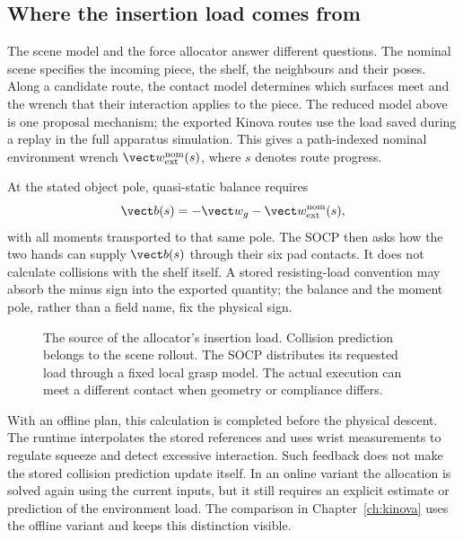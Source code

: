 \subsection{Where the insertion load comes from}
\label{sec:insertion-load-source}

The scene model and the force allocator answer different questions. The nominal scene specifies the incoming piece, the shelf, the neighbours and their poses. Along a candidate route, the contact model determines which surfaces meet and the wrench that their interaction applies to the piece. The reduced model above is one proposal mechanism; the exported Kinova routes use the load saved during a replay in the full apparatus simulation. This gives a path-indexed nominal environment wrench $\vect w_{\mathrm{ext}}^{\mathrm{nom}}(s)$, where $s$ denotes route progress.

At the stated object pole, quasi-static balance requires
\begin{equation}
\vect b(s)=-\vect w_g-\vect w_{\mathrm{ext}}^{\mathrm{nom}}(s),
\label{eq:insertion-load-source}
\end{equation}
with all moments transported to that same pole. The SOCP then asks how the two hands can supply $\vect b(s)$ through their six pad contacts. It does not calculate collisions with the shelf itself. A stored resisting-load convention may absorb the minus sign into the exported quantity; the balance and the moment pole, rather than a field name, fix the physical sign.

\begin{figure}[htbp]\centering
{}
\caption{The source of the allocator's insertion load. Collision prediction belongs to the scene rollout. The SOCP distributes its requested load through a fixed local grasp model. The actual execution can meet a different contact when geometry or compliance differs.}
\label{fig:insertion-load-blocks}
\end{figure}

With an offline plan, this calculation is completed before the physical descent. The runtime interpolates the stored references and uses wrist measurements to regulate squeeze and detect excessive interaction. Such feedback does not make the stored collision prediction update itself. In an online variant the allocation is solved again using the current inputs, but it still requires an explicit estimate or prediction of the environment load. The comparison in Chapter~\ref{ch:kinova} uses the offline variant and keeps this distinction visible.

